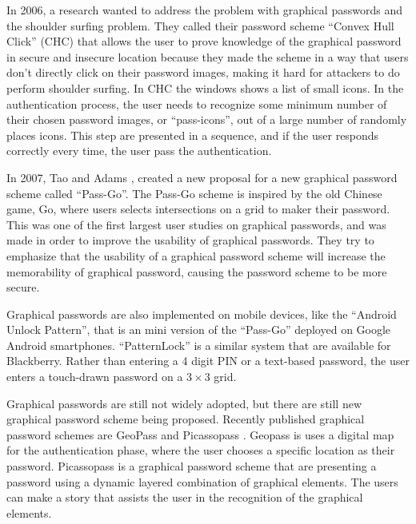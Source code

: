   In 2006, a research wanted to address the problem with graphical passwords and the shoulder surfing problem. They called their password scheme ``Convex Hull Click'' (CHC) \cite{Wiedenbeck} that allows the user to prove knowledge of the graphical password in secure and insecure location because they made the scheme in a way that users don't directly click on their password images, making it hard for attackers to do perform shoulder surfing. In CHC the windows shows a list of small icons. In the authentication process, the user needs to recognize some minimum number of their chosen password images, or ``pass-icons'', out of a large number of randomly places icons. This step are presented in a sequence, and if the user responds correctly every time, the user pass the authentication.
  
  In 2007, Tao and Adams \cite{Tao}, created a new proposal for a new graphical password scheme called ``Pass-Go''. The Pass-Go scheme is inspired by the old Chinese game, Go, where users selects intersections on a grid to maker their password. This was one of the first largest user studies on graphical passwords, and was made in order to improve the usability of graphical passwords. They try to emphasize that the usability of a graphical password scheme will increase the memorability of graphical password, causing the password scheme to be more secure.  

  Graphical passwords are also implemented on mobile devices, like the ``Android Unlock Pattern'', that is an mini version of the ``Pass-Go'' deployed on Google Android smartphones. ``PatternLock'' is a similar system that are available for Blackberry. Rather than entering a 4 digit PIN or a text-based password, the user enters a touch-drawn password on a $3\times3$ grid.

  Graphical passwords are still not widely adopted, but there are still new graphical password scheme being proposed. Recently published  graphical password schemes are GeoPass \cite{GeoPass} and Picassopass \cite{PicassoPass}. Geopass is uses a digital map for the authentication phase, where the user chooses a specific location as their password. Picassopass is a graphical password scheme that are presenting a password using a dynamic layered combination of graphical elements. The users can make a story that assists the user in the recognition of the graphical elements.

 
